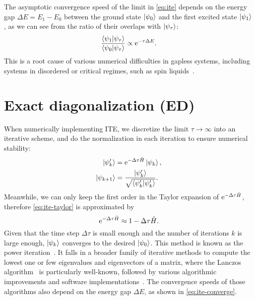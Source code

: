 The asymptotic convergence speed of the limit in \cref{eq:ite} depends on the energy gap $\Delta E = E_1 - E_0$ between the ground state $\ket{\psi_0}$ and the first excited state $\ket{\psi_1}$, as we can see from the ratio of their overlaps with $\ket{\psi_\tau}$:
\begin{equation}
\frac{\ip{\psi_1}{\psi_\tau}}{\ip{\psi_0}{\psi_\tau}} \propto \rme^{-\tau \Delta E}. \label{eq:ite-converge}
\end{equation}
This is a root cause of various numerical difficulties in gapless systems, including systems in disordered or critical regimes, such as spin liquids~\cite{balents2010spin, misguich2011quantum, mila2015frustrated}.

\vfill

\section{Exact diagonalization (ED)}
\label{sec:ed}

When numerically implementing ITE, we discretize the limit $\tau \to \infty$ into an iterative scheme, and do the normalization in each iteration to ensure numerical stability:
\begin{align}
\ket{\psi'_k} &= \rme^{-\Delta \tau \hat{H}} \ket{\psi_k}, \\
\ket{\psi_{k + 1}} &= \frac{\ket{\psi'_k}}{\sqrt{\ip{\psi'_k}}}.
\end{align}
Meanwhile, we can only keep the first order in the Taylor expansion of $\mathrm{e}^{-\Delta \tau \hat{H}}$, therefore \cref{eq:ite-taylor} is approximated by
\begin{equation}
\mathrm{e}^{-\Delta \tau \hat{H}} \approx 1 - \Delta \tau \hat{H}.
\end{equation}
Given that the time step $\Delta \tau$ is small enough and the number of iterations $k$ is large enough, $\ket{\psi_k}$ converges to the desired $\ket{\psi_0}$. This method is known as the power iteration~\cite{mises1929praktische}. It falls in a broader family of iterative methods to compute the lowest one or few eigenvalues and eigenvectors of a matrix, where the Lanczos algorithm~\cite{lanczos1950iteration} is particularly well-known, followed by various algorithmic improvements and software implementations~\cite{knyazev2001toward, stathopoulos2010primme}. The convergence speeds of those algorithms also depend on the energy gap $\Delta E$, as shown in \cref{eq:ite-converge}.

